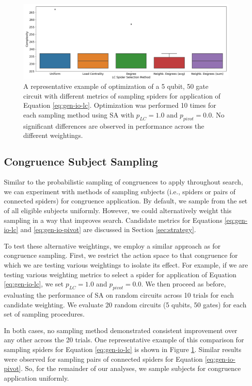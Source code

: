 \begin{figure}[t]
\centering
\includegraphics[width=13cm]{img/subj-sampling-ex.png}
\caption{
  A representative example of optimization of a 5 qubit, 50 gate circuit with different metrics of sampling spiders for application of Equation \ref{eq:gen-io-lc}.
  Optimization was performed 10 times for each sampling method using SA with $p_{LC} = 1.0$ and $p_{pivot} = 0.0$.
  No significant differences are observed in performance across the different weightings.
}
\label{fig:subj-sampling}
\end{figure}


\subsection*{Congruence Subject Sampling}

Similar to the probabilistic sampling of congruences to apply throughout search, we can experiment with methods of sampling subjects (i.e., spiders or pairs of connected spiders) for congruence application.
By default, we sample from the set of all eligible subjects uniformly.
However, we could alternatively weight this sampling in a way that improves search.
Candidate metrics for Equations \ref{eq:gen-io-lc} and \ref{eq:gen-io-pivot} are discussed in Section \ref{sec:strategy}.

To test these alternative weightings, we employ a similar approach as for congruence sampling.
First, we restrict the action space to that congruence for which we are testing various weightings to isolate its effect.
For example, if we are testing various weighting metrics to select a spider for application of Equation \ref{eq:gen-io-lc}, we set $p_{LC} = 1.0$ and $p_{pivot} = 0.0$.
We then proceed as before, evaluating the performance of SA on random circuits across 10 trials for each candidate weighting.
We evaluate 20 random circuits (5 qubits, 50 gates) for each set of sampling procedures.

In both cases, no sampling method demonstrated consistent improvement over any other across the 20 trials.
One representative example of this comparison for sampling spiders for Equation \ref{eq:gen-io-lc} is shown in Figure \ref{fig:subj-sampling}.
Similar results were observed for sampling pairs of connected spiders for Equation \ref{eq:gen-io-pivot}.
So, for the remainder of our analyses, we sample subjects for congruence application uniformly.

